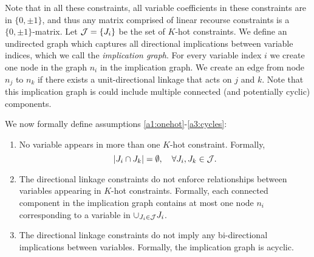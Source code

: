 Note that in all these constraints, all variable coefficients in these constraints are in $\{0, \pm 1\}$, and thus any matrix comprised of linear recourse constraints is a $\{0, \pm 1\}$-matrix. Let ${\cal J} = \{J_i\}$ be the set of $K$-hot constraints. We define an undirected graph which captures all directional implications between variable indices, which we call the \emph{implication graph}. For every variable index $i$ we create one node in the graph $n_i$ in the implication graph. We create an edge from node $n_j$ to $n_k$ if there exists a unit-directional linkage that acts on $j$ and $k$. Note that this implication graph is could include multiple connected (and potentially cyclic) components. 


We now formally define assumptions \ref{a1:onehot}-\ref{a3:cycles}:
\begin{enumerate}[label={A.\arabic*}, itemsep=0pt]
\item No variable appears in more than one $K$-hot constraint. Formally, $$ |J_i \cap J_k| = \emptyset, \quad \forall J_i, J_k \in {\cal J}.$$
\item The directional linkage constraints do not enforce relationships between variables appearing in $K$-hot constraints. Formally, each connected component in the implication graph contains at most one node $n_i$ corresponding to a variable in ${\cup_{J_i \in \cal J} J_i}$.
\item The directional linkage constraints do not imply any bi-directional implications between variables. Formally, the implication graph is acyclic. 
\end{enumerate}

